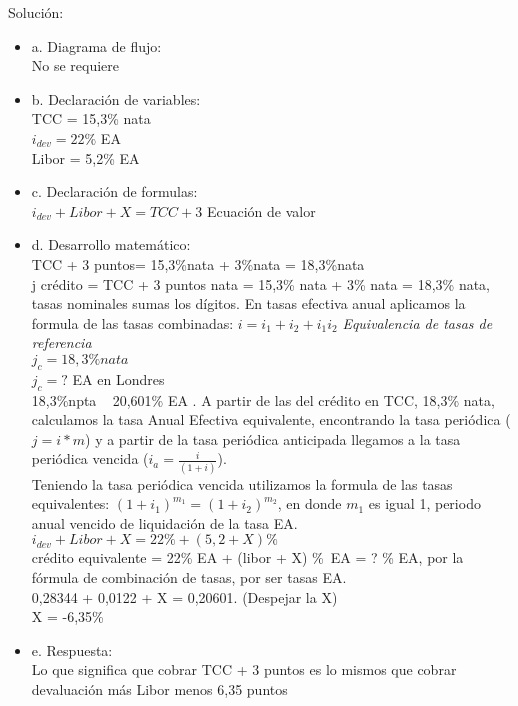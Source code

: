 	Solución:
	\begin{itemize}
		\item a. Diagrama de flujo:\\
		No se requiere
		\item b. Declaración de variables:\\
		
		TCC = 15,3\% nata\\
		$i_{dev} = 22\%$ EA\\
		Libor = 5,2\% EA\\
		\item c. Declaración de formulas:\\
		
		$i_{dev} + Libor + X = TCC + 3$  Ecuación de valor\\
		\item d. Desarrollo matemático:\\
		
		TCC + 3 puntos= 15,3\%nata + 3\%nata = 18,3\%nata\\
		j crédito = TCC + 3 puntos nata = 15,3\% nata + 3\% nata = 18,3\% nata, tasas nominales sumas los dígitos. En tasas efectiva anual aplicamos la formula de las tasas combinadas: $i = i_{1} + i_{2} + i_{1} i_{2}$ \hspace{35}\textit{  Equivalencia de tasas de referencia} \\
        
        $j_{c} = 18,3\% nata$ \\
        $j_{c} = ?$ EA en Londres \\
		
		18,3\%npta ~ 20,601\% EA . A partir de las del crédito en TCC, 18,3\% nata, calculamos la tasa Anual Efectiva equivalente, encontrando la tasa periódica ($j = i*m$)
        y a partir de la tasa periódica anticipada llegamos a la tasa periódica vencida ($i_{a} = \frac{i}{(1+i)}$).\\
        Teniendo la tasa periódica vencida utilizamos la formula de las tasas equivalentes:
        $(1 + i_{1})^{m_{1}} = (1 + i_{2})^{m_{2}}$, en donde $m_{1}$ es igual 1, periodo anual vencido de liquidación de la tasa EA.\\
		$i_{dev} + Libor + X = 22\% + (5,2+ X)\%$\\
		crédito equivalente = 22\% EA + (libor + X) \%\ EA = ? \% EA, por la fórmula de combinación de tasas, por ser tasas EA.\\
		0,28344 + 0,0122 + X = 0,20601. (Despejar la X) \\
		X = -6,35\% \\
		\item e. Respuesta:\\
		
		Lo que significa que cobrar TCC + 3 puntos es lo mismos que cobrar devaluación más Libor menos 6,35 puntos\\
	\end{itemize}
	
